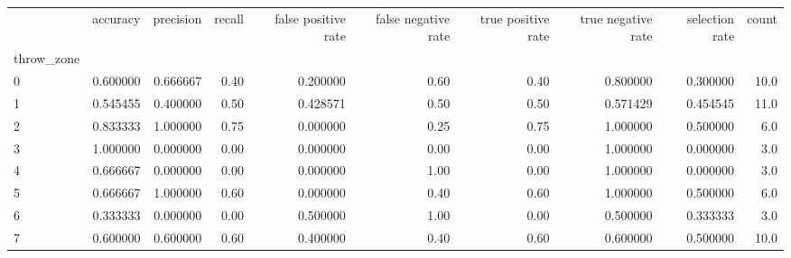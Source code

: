 \begin{tabular}{lrrrrrrrrr}
\toprule
{} &  accuracy &  precision &  recall &  false positive rate &  false negative rate &  true positive rate &  true negative rate &  selection rate &  count \\
throw\_zone &           &            &         &                      &                      &                     &                     &                 &        \\
\midrule
0          &  0.600000 &   0.666667 &    0.40 &             0.200000 &                 0.60 &                0.40 &            0.800000 &        0.300000 &   10.0 \\
1          &  0.545455 &   0.400000 &    0.50 &             0.428571 &                 0.50 &                0.50 &            0.571429 &        0.454545 &   11.0 \\
2          &  0.833333 &   1.000000 &    0.75 &             0.000000 &                 0.25 &                0.75 &            1.000000 &        0.500000 &    6.0 \\
3          &  1.000000 &   0.000000 &    0.00 &             0.000000 &                 0.00 &                0.00 &            1.000000 &        0.000000 &    3.0 \\
4          &  0.666667 &   0.000000 &    0.00 &             0.000000 &                 1.00 &                0.00 &            1.000000 &        0.000000 &    3.0 \\
5          &  0.666667 &   1.000000 &    0.60 &             0.000000 &                 0.40 &                0.60 &            1.000000 &        0.500000 &    6.0 \\
6          &  0.333333 &   0.000000 &    0.00 &             0.500000 &                 1.00 &                0.00 &            0.500000 &        0.333333 &    3.0 \\
7          &  0.600000 &   0.600000 &    0.60 &             0.400000 &                 0.40 &                0.60 &            0.600000 &        0.500000 &   10.0 \\
\bottomrule
\end{tabular}
